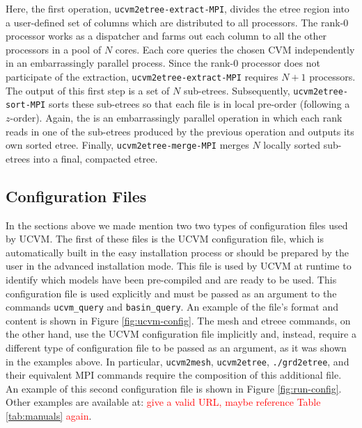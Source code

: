 Here, the first operation, \texttt{ucvm2etree-extract-MPI}, divides the etree region into a user-defined set of columns which are distributed to all processors. The rank-0 processor works as a dispatcher and farms out each column to all the other processors in a pool of $N$ cores. Each core queries the chosen CVM independently in an embarrassingly parallel process. Since the rank-0 processor does not participate of the extraction, \texttt{ucvm2etree-extract-MPI} requires $N+1$ processors. The output of this first step is a set of $N$ sub-etrees. Subsequently, \texttt{ucvm2etree-sort-MPI} sorts these sub-etrees so that each file is in local pre-order (following a $z$-order). Again, the is an embarrassingly parallel operation in which each rank reads in one of the sub-etrees produced by the previous operation and outputs its own sorted etree. Finally, \texttt{ucvm2etree-merge-MPI} merges $N$ locally sorted sub-etrees into a final, compacted etree.

\subsection{Configuration Files}

In the sections above we made mention two two types of configuration files used by UCVM. The first of these files is the UCVM configuration file, which is automatically built in the easy installation process or should be prepared by the user in the advanced installation mode. This file is used by UCVM at runtime to identify which models have been pre-compiled and are ready to be used. This configuration file is used explicitly and must be passed as an argument to the commands \texttt{ucvm\_query} and \texttt{basin\_query}. An example of the file's format and content is shown in Figure \ref{fig:ucvm-config}. The mesh and etreee commands, on the other hand, use the UCVM configuration file implicitly and, instead, require a different type of configuration file to be passed as an argument, as it was shown in the examples above. In particular, \texttt{ucvm2mesh}, \texttt{ucvm2etree}, \texttt{./grd2etree}, and their equivalent MPI commands require the composition of this additional file. An example of this second configuration file is shown in Figure \ref{fig:run-config}. Other examples are available at: \textcolor{red}{give a valid URL, maybe reference Table \ref{tab:manuals} again}.


